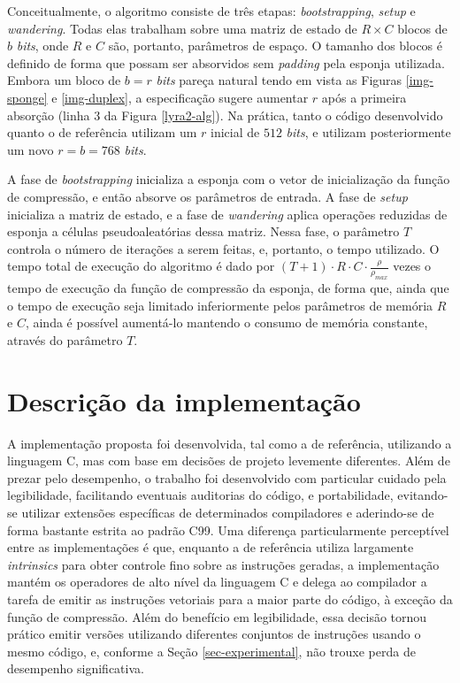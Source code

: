 \documentclass{article}
\begin{document}
Conceitualmente, o algoritmo consiste de três etapas: \emph{bootstrapping},
\emph{setup} e \emph{wandering}. Todas elas trabalham sobre uma matriz
de estado de $R \times C$ blocos de $b$ \emph{bits}, onde $R$ e $C$
são, portanto, parâmetros de espaço.
%
O tamanho dos blocos é definido de forma que possam ser absorvidos sem
\emph{padding} pela esponja utilizada. Embora um bloco de $b = r$ \emph{bits}
pareça natural tendo em vista as Figuras \ref{img-sponge} e
\ref{img-duplex}, a especificação sugere aumentar $r$ após a primeira
absorção (linha 3 da Figura \ref{lyra2-alg}). Na prática, tanto o
código desenvolvido quanto o de referência utilizam um $r$ inicial de $512$ \emph{bits},
e utilizam posteriormente um novo $r = b = 768$ \emph{bits}.

A fase de \emph{bootstrapping} inicializa a esponja com o vetor de
inicialização da função de compressão, e então absorve os parâmetros de
entrada. A fase de \emph{setup} inicializa a matriz de estado, e a fase
de \emph{wandering} aplica operações reduzidas de esponja a células
pseudoaleatórias dessa matriz. Nessa fase, o parâmetro $T$ controla o
número de iterações a serem feitas, e, portanto, o tempo utilizado.
O tempo total de execução do algoritmo é dado por
$(T + 1) \cdot R \cdot C \cdot \frac{\rho}{\rho_{max}}$ vezes o tempo
de execução da função de compressão da esponja, de forma que, ainda que
o tempo de execução seja limitado inferiormente pelos parâmetros de
memória $R$ e $C$, ainda é possível aumentá-lo mantendo o consumo de
memória constante, através do parâmetro $T$.

\section{Descrição da implementação}\label{sec-impl}

A implementação proposta foi desenvolvida, tal como a de referência, utilizando
a linguagem C, mas com base em decisões de projeto levemente diferentes. Além
de prezar pelo desempenho, o trabalho foi desenvolvido com particular cuidado
pela legibilidade, facilitando eventuais auditorias do código, e portabilidade,
evitando-se utilizar extensões específicas de determinados compiladores e
aderindo-se de forma bastante estrita ao padrão C99.
%
Uma diferença particularmente perceptível entre as implementações é que,
enquanto a de referência utiliza largamente \emph{intrinsics} para obter
controle fino sobre as instruções geradas, a implementação mantém os
operadores de alto nível da linguagem C e delega ao compilador a tarefa
de emitir as instruções vetoriais para a maior parte do código, à
exceção da função de compressão. Além do benefício em legibilidade, essa
decisão tornou prático emitir versões utilizando diferentes conjuntos de
instruções usando o mesmo código, e, conforme a Seção
\ref{sec-experimental}, não trouxe perda de desempenho significativa.
\end{document}
